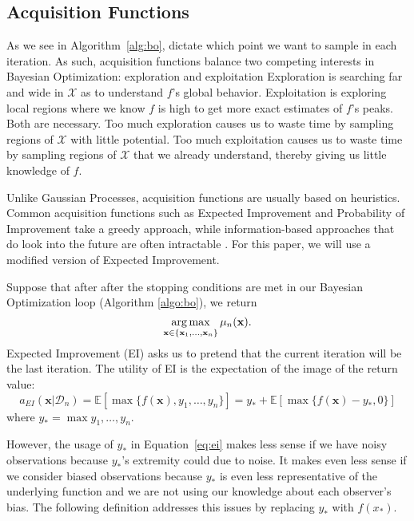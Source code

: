 \subsection{Acquisition Functions}
As we see in Algorithm~\ref{alg:bo}, dictate which point we want to sample in each iteration.
As such, acquisition functions balance two competing interests in Bayesian Optimization: exploration and exploitation
Exploration is searching far and wide in $\mathcal{X}$ as to understand $f$'s global behavior.
Exploitation is exploring local regions where we know $f$ is high to get more exact estimates of $f$'s peaks.
Both are necessary.
Too much exploration causes us to waste time by sampling regions of $\mathcal{X}$ with little potential.
Too much exploitation causes us to waste time by sampling regions of $\mathcal{X}$ that we already understand, thereby giving us little knowledge of $f$.

Unlike Gaussian Processes, acquisition functions are usually based on heuristics.
Common acquisition functions such as Expected Improvement and Probability of Improvement take a greedy approach, while
information-based approaches that do look into the future are often intractable \cite{shahriari2016}.
For this paper, we will use a modified version of Expected Improvement.

Suppose that after after the stopping conditions are met in our Bayesian Optimization loop (Algorithm \ref{algo:bo}),
we return 
\begin{equation*}
    \operatorname*{arg\,max}_{\mathbf{x} \in \{ \mathbf{x}_1, \ldots, \mathbf{x}_n \}} \mu_n(\mathbf{x}).
\end{equation*}
Expected Improvement (EI) asks us to pretend that the current iteration will be the last iteration.
The utility of EI is the expectation of the image of the return value:
\begin{equation}\label{eq:ei}
    a_{EI}(\mathbf{x} | \mathcal{D}_n) = \mathbb{E}[\max\{f(\mathbf{x}), y_1, \ldots, y_n\}]
    = y_* + \mathbb{E}[\max\{f(\mathbf{x}) - y_*, 0\}]
\end{equation}
where $y_* = \max{y_1, \ldots, y_n}$.

However, the usage of $y_*$ in Equation~\ref{eq:ei} makes less sense if we have noisy observations because $y_*$'s extremity could due to noise.
It makes even less sense if we consider biased observations because $y_*$ is even less representative of the underlying function and we are not using our knowledge about each observer's bias.
The following definition addresses this issues by replacing $y_*$ with $f(x_*)$.

